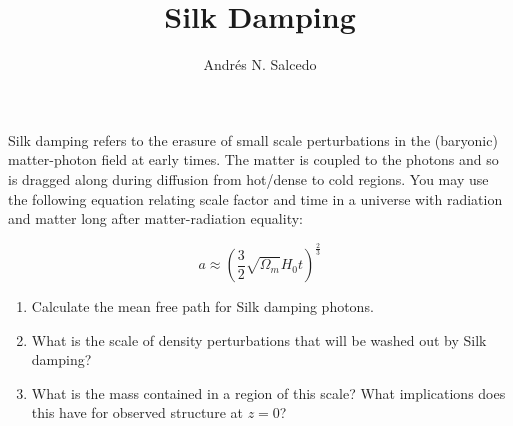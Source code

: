 \documentclass{article}
\title{Silk Damping}
\author{Andr\'{e}s N. Salcedo}
\begin{document}
\maketitle

Silk damping refers to the erasure of small scale perturbations in the (baryonic) matter-photon field at early times. The matter is coupled to the photons and so is dragged along during diffusion from hot/dense to cold regions. You may use the following equation relating scale factor and time in a universe with radiation and matter long after matter-radiation equality:

$$ a \approx \left( \frac{3}{2} \sqrt{\Omega_m} H_0 t \right)^{\frac{2}{3}} $$

\begin{enumerate}

\item Calculate the mean free path for Silk damping photons.

\item What is the scale of density perturbations that will be washed out by Silk damping?

\item What is the mass contained in a region of this scale? What implications does this have for observed structure at $z=0$?
  
\end{enumerate}
\end{document}
